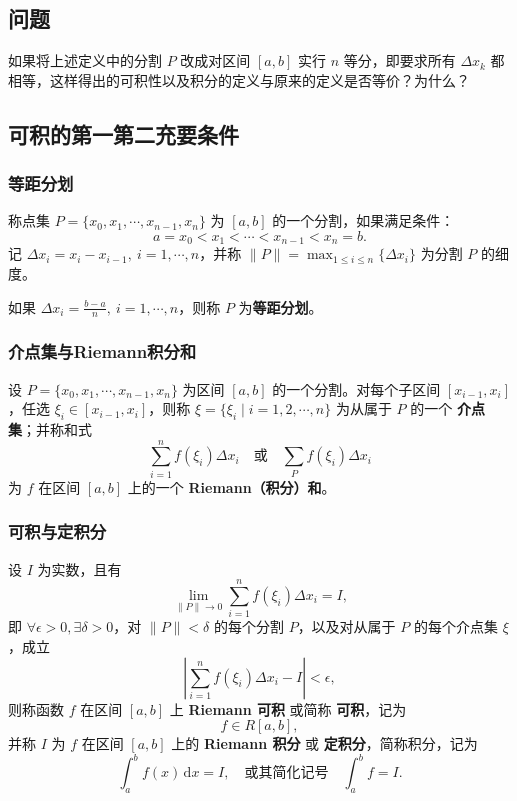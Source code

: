 \documentclass[12pt]{ctexart}
\begin{document}
\subsection{问题}
如果将上述定义中的分割 $P$ 改成对区间 $[a,b]$ 实行 $n$ 等分，即要求所有 $\Delta x_k$ 都相等，这样得出的可积性以及积分的定义与原来的定义是否等价？为什么？

\subsection{可积的第一第二充要条件}

\subsubsection*{等距分划}
称点集 $P = \{x_0, x_1, \cdots, x_{n-1}, x_n\}$ 为 $[a, b]$ 的一个分割，如果满足条件：
\[
a = x_0 < x_1 < \cdots < x_{n-1} < x_n = b.
\]
记 $\Delta x_i = x_i - x_{i-1}, \ i = 1, \cdots, n$，并称 $\|P\| = \max_{1 \leq i \leq n} \{\Delta x_i\}$ 为分割 $P$ 的细度。

如果 $\Delta x_i = \frac{b-a}{n}, \ i = 1, \cdots, n$，则称 $P$ 为\textbf{等距分划}。

\subsubsection*{介点集与Riemann积分和}
设 $P = \{x_0, x_1, \cdots, x_{n-1}, x_n\}$ 为区间 $[a, b]$ 的一个分割。对每个子区间 $[x_{i-1}, x_i]$，任选 $\xi_i \in [x_{i-1}, x_i]$，则称 $\xi = \{\xi_i \mid i = 1, 2, \cdots, n\}$ 为从属于 $P$ 的一个 \textbf{介点集}；并称和式
\[
\sum_{i=1}^n f(\xi_i) \Delta x_i \quad \text{或} \quad \sum_P f(\xi_i) \Delta x_i
\]
为 $f$ 在区间 $[a, b]$ 上的一个 \textbf{Riemann（积分）和}。

\subsubsection*{可积与定积分}
设 $I$ 为实数，且有
\[
\lim_{\|P\| \to 0} \sum_{i=1}^n f(\xi_i) \Delta x_i = I,
\]
即 $\forall \epsilon > 0, \exists \delta > 0$，对 $\|P\| < \delta$ 的每个分割 $P$，以及对从属于 $P$ 的每个介点集 $\xi$，成立
\[
\left| \sum_{i=1}^n f(\xi_i) \Delta x_i - I \right| < \epsilon,
\]
则称函数 $f$ 在区间 $[a, b]$ 上 \textbf{Riemann 可积} 或简称 \textbf{可积}，记为
\[
f \in R[a, b],
\]
并称 $I$ 为 $f$ 在区间 $[a, b]$ 上的 \textbf{Riemann 积分} 或 \textbf{定积分}，简称积分，记为
\[
\int_a^b f(x) \, \mathrm{d}x = I, \quad \text{或其简化记号} \quad \int_a^b f = I.
\]
\end{document}
